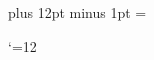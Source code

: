 \def\footnoterule{\kern-3\p@ \hrule height \z@ \kern 3\p@}

\skip\footins=19.5pt plus 12pt minus 1pt
\count{}
\dimen\footins=\maxdimen



\def\landscape{%
  \global\TEMPDIMEN=\PageWidth
  \global\PageWidth=\PageHeight
  \global\PageHeight=\TEMPDIMEN
  \global\let\landscape=\relax%
  \onecolumn
  \message{(landscape)}%
  \raggedbottom
}






\Warn{\start@mess}

\newif\ifCUPmtplainloaded %
\ifprod@font
  \global\CUPmtplainloadedtrue
\fi

\def\mnmacrosloaded{} %

\catcode `\@=12 %



